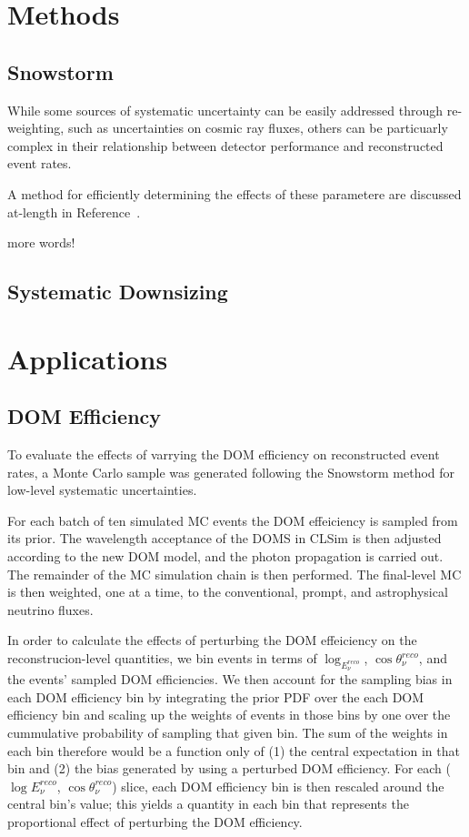 \documentclass[main.tex]{subfiles}
\begin{document}
\section{Methods}
\subsection{Snowstorm}
While some sources of systematic uncertainty can be easily addressed through re-weighting, such as uncertainties on cosmic ray fluxes, others can be particuarly complex in their relationship between detector performance and reconstructed event rates. 

A method for efficiently determining the effects of these parametere are discussed at-length in Reference~\cite{Aartsen_2019_snow}.


more words! 

\subsection{Systematic Downsizing}


\section{Applications}
\subsection{DOM Efficiency}

To evaluate the effects of varrying the DOM efficiency on reconstructed event rates, a Monte Carlo sample was generated following the Snowstorm method for low-level systematic uncertainties.

For each batch of ten simulated MC events the DOM effeiciency is sampled from its prior. 
The wavelength acceptance of the DOMS in CLSim is then adjusted according to the new DOM model, and the photon propagation is carried out. 
The remainder of the MC simulation chain is then performed.
The final-level MC is then weighted, one at a time, to the conventional, prompt, and astrophysical neutrino fluxes. 

In order to calculate the effects of perturbing the DOM effeiciency on the reconstrucion-level quantities, we bin events in terms of $\log_{E_{\nu}^{reco}}$, $\cos\theta_{\nu}^{reco}$, and the events' sampled DOM efficiencies. 
We then account for the sampling bias in each DOM efficiency bin by integrating the prior PDF over the each DOM efficiency bin and scaling up the weights of events in those bins by one over the cummulative probability of sampling that given bin. 
The sum of the weights in each bin therefore would be a function only of (1) the central expectation in that bin and (2) the bias generated by using a perturbed DOM efficiency. 
For each ($\log E_{\nu}^{reco}$, $\cos\theta_{\nu}^{reco}$) slice, each DOM efficiency bin is then rescaled around the central bin's value; this yields a quantity in each bin that represents the proportional effect of perturbing the DOM efficiency. 
\end{document}
